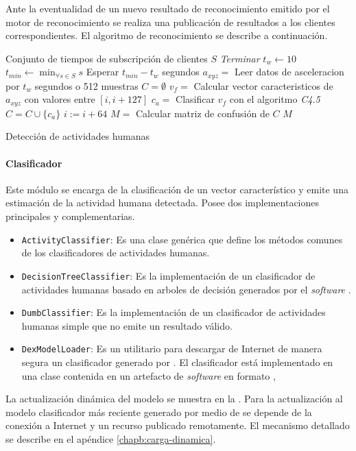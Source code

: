 Ante la eventualidad de un nuevo resultado de reconocimiento emitido
por el motor de reconocimiento se realiza una publicación de resultados
a los clientes correspondientes. El algoritmo de reconocimiento se
describe a continuación.

\begin{algorithm}[H]
\begin{algorithmic}[1]
    \Require Conjunto de tiempos de subscripción de clientes $S$
 			\State\textit{Terminar}
		\EndIf
		\State $t_w \leftarrow 10$
		\State $t_{min} \leftarrow \min_{\forall s \in S} s$
		\State Esperar $t_{min} - t_w$ segundos 
		\State $ a_{xyz} = $ Leer datos de asceleracion por $t_w$ segundos o 512 muestras
		\State $ C = \emptyset$
			\State $ v_f = $ Calcular vector caracteristicos de $a_{xyz}$ con valores entre $[i, i + 127]$
			\State $ c_a = $ Clasificar $v_f$ con el algoritmo \textit{C4.5}
			\State $ C = C \cup \{c_a\}$ 
			\State $i := i + 64$
        \EndFor
        \State $ M = $ Calcular matriz de confusión de $C$ 
		\State
		\Return $ M $
	\EndProcedure
\end{algorithmic}

\caption{\label{alg5:reconocimiento}Detección de actividades humanas}
\end{algorithm}


\paragraph{Clasificador}

Este módulo se encarga de la clasificación de un vector característico
y emite una estimación de la actividad humana detectada. Posee dos
implementaciones principales y complementarias.
\begin{itemize}
\item \texttt{\small{}ActivityClassifier}: Es una clase genérica que define
los métodos comunes de los clasificadores de actividades humanas.
\item \texttt{\small{}DecisionTreeClassifier}: Es la implementación de un
clasificador de actividades humanas basado en arboles de decisión
generados por el \emph{software} \texttt{} \cite{Frank2016}.
\item \texttt{\small{}DumbClassifier}: Es la implementación de un clasificador
de actividades humanas simple que no emite un resultado válido.
\item \texttt{\small{}DexModelLoader}: Es un utilitario para descargar de
Internet de manera segura un clasificador generado por .
El clasificador está implementado en una clase contenida en un artefacto
de \emph{software} en formato ,
\end{itemize}
La actualización dinámica del modelo se muestra en la .
Para la actualización al modelo clasificador más reciente generado
por medio de  se depende de la conexión a Internet y un
recurso publicado remotamente. El mecanismo detallado se describe
en el apéndice \ref{chapb:carga-dinamica}.

